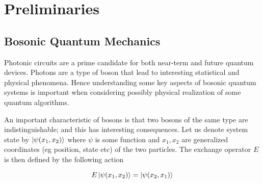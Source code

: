 \documentclass{article}
\begin{document}
\section{Preliminaries}
\label{sec:prelim}

\subsection{Bosonic Quantum Mechanics}
Photonic circuits are a prime candidate for both near-term and future quantum devices. Photons are a type of boson that lead to interesting statistical and physical phenomena. Hence understanding some key aspects of bosonic quantum systems is important when considering possibly physical realization of some quantum algorithms. 




An important characteristic of bosons is that two bosons of the same type are indistinguishable; and this has interesting consequences. 
Let us denote system state by $\ket{\psi(x_1,x_2)}$ where $\psi$ is some function and $x_1,x_2$ are generalized coordinates (eg position, state etc) of the two particles. The exchange operator $E$ is then defined by the following action

$$
E\ket{\psi(x_1,x_2)} = \ket{\psi(x_2,x_1)}
$$
\end{document}
